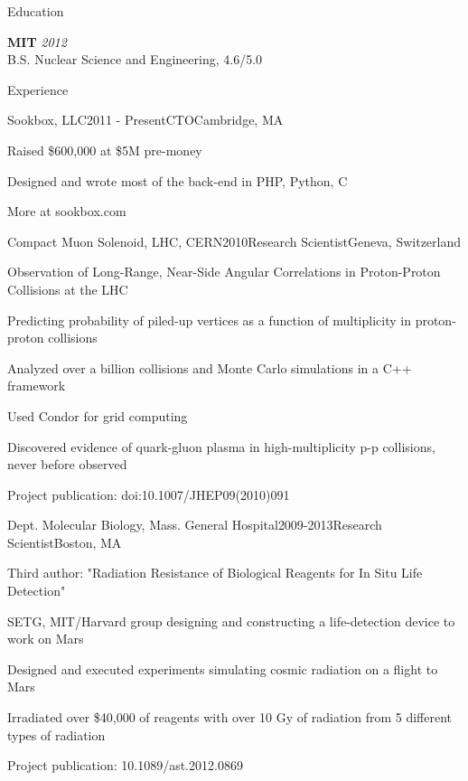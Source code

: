 \documentclass{resume}
\begin{document}

\begin{rSection}{Education}

{\bf MIT} \hfill {\em 2012} \\ 
B.S. Nuclear Science and Engineering, 4.6/5.0

\end{rSection}

\begin{rSection}{Experience}

\begin{rSubsection}{Sookbox, LLC}{2011 - Present}{CTO}{Cambridge, MA}
\item Raised \$600,000 at \$5M pre-money
\item Designed and wrote most of the back-end in PHP, Python, C
\item More at sookbox.com

\end{rSubsection}


\begin{rSubsection}{Compact Muon Solenoid, LHC, CERN}{2010}{Research Scientist}{Geneva, Switzerland}
\item Observation of Long-Range, Near-Side Angular Correlations in Proton-Proton Collisions at the LHC
\item Predicting probability of piled-up vertices as a function of multiplicity in proton-proton collisions
\item Analyzed over a billion collisions and Monte Carlo simulations in a C++ framework
\item Used Condor for grid computing
\item Discovered evidence of quark-gluon plasma in high-multiplicity p-p collisions, never before observed
\item Project publication: doi:10.1007/JHEP09(2010)091

\end{rSubsection}


\begin{rSubsection}{Dept. Molecular Biology, Mass. General Hospital}{2009-2013}{Research Scientist}{Boston, MA}
\item Third author: "Radiation Resistance of Biological Reagents for In Situ Life Detection"
\item SETG, MIT/Harvard group designing and constructing a life-detection device to work on Mars
\item Designed and executed experiments simulating cosmic radiation on a flight to Mars
\item Irradiated over \$40,000 of reagents with over 10 Gy of radiation from 5 different types of radiation
\item Project publication: 10.1089/ast.2012.0869
\end{rSubsection}


\end{rSection}
\end{document}
